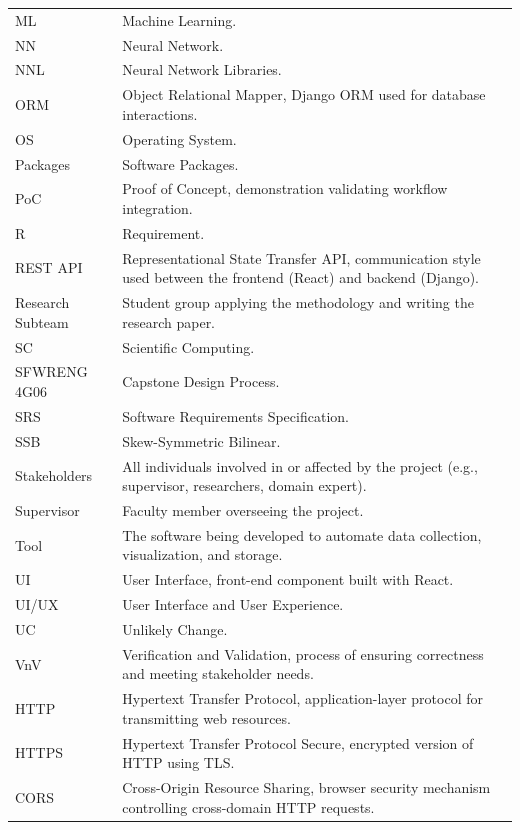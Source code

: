 \documentclass[12pt, titlepage]{article}
\begin{document}
\begin{longtable}{@{}l p{}@{}}
ML & Machine Learning. \\
NN & Neural Network. \\
NNL & Neural Network Libraries. \\
ORM & Object Relational Mapper, Django ORM used for database interactions. \\
OS & Operating System. \\
Packages & Software Packages. \\
PoC & Proof of Concept, demonstration validating workflow integration. \\
R & Requirement. \\
REST API & Representational State Transfer API, communication style used between the frontend (React) and backend (Django). \\
Research Subteam & Student group applying the methodology and writing the research paper. \\
SC & Scientific Computing. \\
SFWRENG 4G06 & Capstone Design Process. \\
SRS & Software Requirements Specification. \\
SSB & Skew-Symmetric Bilinear. \\
Stakeholders & All individuals involved in or affected by the project (e.g., supervisor, researchers, domain expert). \\
Supervisor & Faculty member overseeing the project. \\
Tool & The software being developed to automate data collection, visualization, and storage. \\
UI & User Interface, front-end component built with React. \\
UI/UX & User Interface and User Experience. \\
UC & Unlikely Change. \\
VnV & Verification and Validation, process of ensuring correctness and meeting stakeholder needs. \\
HTTP & Hypertext Transfer Protocol, application-layer protocol for transmitting web resources. \\
HTTPS & Hypertext Transfer Protocol Secure, encrypted version of HTTP using TLS. \\
CORS & Cross-Origin Resource Sharing, browser security mechanism controlling cross-domain HTTP requests. \\
\end{longtable}

\newpage

\tableofcontents
\end{document}
